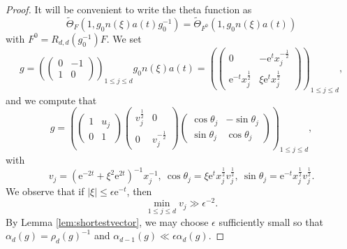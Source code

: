 \documentclass[12pt]{amsart}
\theoremstyle{definition}
\theoremstyle{remark}
\numberwithin{equation}{section}
\newcommand{\e}{\mathrm{e}}
\begin{document}
\begin{proof}
It will be convenient to write the theta function as 
\begin{equation}
\widetilde\Theta_F(1, g_0 n(\xi) a(t) g_0^{-1}) =
\widetilde\Theta_{F^0}(1, g_0 n(\xi) a(t))
\end{equation}
with $F^0 = R_{d,d}(g_0^{-1}) F$.
We set 
\begin{equation}
  \label{eq:JgXM}
  g = \left(  \begin{pmatrix}   0 & -1 \\
    1 & 0 
  \end{pmatrix}
  \right)_{\!\!1\leq j\leq d}
  g_0  n(\xi) a(t)  = \left(  \begin{pmatrix}   0 & - \e^t x_j^{-\frac{1}{2}} \\
    \e^{-t} x_j^{\frac{1}{2}} & \xi \e^t x_j^{\frac{1}{2}}
  \end{pmatrix}
  \right)_{\!\!1\leq j\leq d},
\end{equation}
and we compute that
\begin{equation}
  \label{eq:gIwasawa}
  g = \left(  \begin{pmatrix}   1 & u_j \\
    0 & 1
  \end{pmatrix}
  \begin{pmatrix}
    v_j^{\frac{1}{2}} & 0 \\
    0 & v_j^{-\frac{1}{2}}
  \end{pmatrix}
  \begin{pmatrix}
    \cos \theta_j & -\sin \theta_j \\
    \sin \theta_j  & \cos \theta_j
  \end{pmatrix}
  \right)_{\!\!1\leq j\leq d},
\end{equation}
with
\begin{equation}
  \label{eq:YRS}
  v_j =  (\e^{-2t} + \xi^2\e^{2t})^{-1}  x_j^{-1},\ \cos \theta_j = \xi \e^t x_j^{\frac{1}{2}}v_j^{\frac{1}{2}},\  \sin \theta_j = \e^{-t} x_j^{\frac{1}{2}}v_j^{\frac{1}{2}}. 
\end{equation}
We observe that if $|\xi| \leq \epsilon \e^{-t}$, then
\begin{equation}
  \label{eq:vnGammang}
  \min_{1\leq j\leq d} v_j \gg \epsilon^{-2}.
\end{equation}
By Lemma \ref{lem:shortestvector}, we may choose $\epsilon$ sufficiently small so that $\alpha_d(g) = \rho_d(g)^{-1}$ and $\alpha_{d-1}(g) \ll \epsilon \alpha_d(g)$. 


\end{proof}
\end{document}
